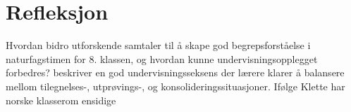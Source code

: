 \documentclass[main.tex]{subfiles}
\begin{document}
\section*{Refleksjon}
\label{sec:3}
Hvordan bidro utforskende samtaler til å skape god begrepsforståelse i naturfagstimen for 8. klassen, 
og hvordan kunne undervisningsopplegget forbedres?
\newline
\newline
{} beskriver en god undervisningsseksens der lærere klarer å balansere mellom 
tilegnelses-, utprøvings-, og konsolideringssituasjoner. Ifølge Klette har norske klasserom ensidige 
\end{document}
